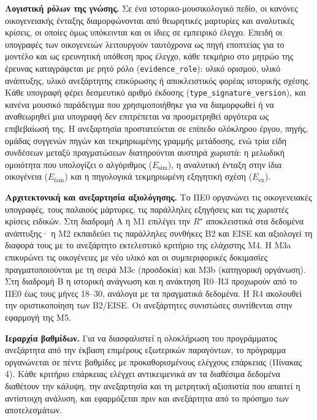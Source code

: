 \documentclass[11pt,a4paper]{article}
\begin{document}
\textbf{Λογιστική ρόλων της γνώσης.} Σε ένα ιστορικο-μουσικολογικό πεδίο, οι κανόνες οικογενειακής ένταξης διαμορφώνονται από θεωρητικές μαρτυρίες και αναλυτικές κρίσεις, οι οποίες όμως υπόκεινται και οι ίδιες σε εμπειρικό έλεγχο. Επειδή οι υπογραφές των οικογενειών λειτουργούν ταυτόχρονα ως πηγή εποπτείας για το μοντέλο και ως ερευνητική υπόθεση προς έλεγχο, κάθε τεκμήριο στο μητρώο της έρευνας καταγράφεται με ρητό ρόλο (\texttt{evidence\_role}): υλικό ορισμού, υλικό ανάπτυξης, υλικό ανεξάρτητης επικύρωσης ή αποκλειστικός φορέας ιστορικής σχέσης. Κάθε υπογραφή φέρει δεσμευτικό αριθμό έκδοσης (\texttt{type\_signature\_version}), και κανένα μουσικό παράδειγμα που χρησιμοποιήθηκε για να διαμορφωθεί ή να αναθεωρηθεί μια υπογραφή δεν επιτρέπεται να προσμετρηθεί αργότερα ως επιβεβαίωσή της. Η ανεξαρτησία προστατεύεται σε επίπεδο ολόκληρου έργου, πηγής, ομάδας συγγενών πηγών και τεκμηριωμένης γραμμής μετάδοσης, ενώ τρία είδη συνδέσεων μεταξύ πραγματώσεων διατηρούνται αυστηρά χωριστά: η μελωδική ομοιότητα που υπολογίζει ο αλγόριθμος (\(E_{\mathrm{sim}}\)), η αναλυτική ένταξη στην ίδια οικογένεια (\(E_{\mathrm{fam}}\)) και η πηγολογικά τεκμηριωμένη εξηγητική σχέση (\(E_{\mathrm{ex}}\)).

\textbf{Αρχιτεκτονική και ανεξαρτησία αξιολόγησης.} Το ΠΕ0 οργανώνει τις οικογενειακές υπογραφές, τους παλαιούς μάρτυρες, τις παράλληλες εξηγήσεις και τις χωριστές κρίσεις ειδικών. Στη διαδρομή Α η Μ1 επιλέγει την $R^\star$ αποκλειστικά στα δεδομένα ανάπτυξης· η Μ2 εκπαιδεύει τις παράλληλες συνθήκες B2 και EISE και αξιολογεί τη διαφορά τους με το ανεξάρτητο εκτελεστικό κριτήριο της ελάχιστης Μ4. Η Μ3a επικυρώνει τις οικογένειες με νέο υλικό και οι συμπεριφορικές δοκιμασίες πραγματοποιούνται με τη σειρά Μ3c (προσδοκία) και Μ3b (κατηγορική οργάνωση). Στη διαδρομή Β η ιστορική ανάγνωση και η ανάκτηση R0--R3 προχωρούν από το ΠΕ0 έως τους μήνες 18--30, ανάλογα με τα πραγματικά δεδομένα. Η R4 ακολουθεί την οριστικοποίηση των B2/EISE. Οι ανεξάρτητες συνιστώσες συντίθενται στην εφαρμογή της Μ5.

\textbf{Ιεραρχία βαθμίδων.} Για να διασφαλιστεί η ολοκλήρωση του προγράμματος ανεξάρτητα από την έκβαση επιμέρους εξωτερικών παραγόντων, το πρόγραμμα οργανώνεται σε πέντε βαθμίδες με προκαθορισμένους ελέγχους επάρκειας (Πίνακας 4). Κάθε κριτήριο επάρκειας ελέγχει αντικειμενικά αν τα διαθέσιμα δεδομένα διαθέτουν την κάλυψη, την ανεξαρτησία και τη μετρητική αξιοπιστία που απαιτεί η αντίστοιχη ανάλυση, και εφαρμόζεται πριν και ανεξάρτητα από το πρόσημο των αποτελεσμάτων.
\end{document}
